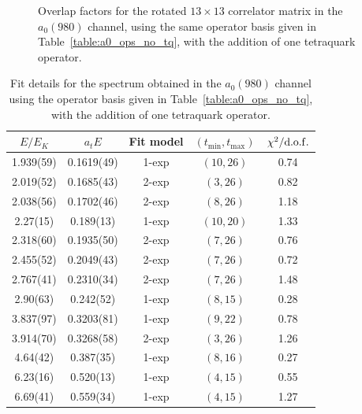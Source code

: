 \begin{figure}
  \caption{Overlap factors for the rotated $13\times 13$ correlator matrix in the $a_0(980)$ channel, using the same operator basis given in Table~\ref{table:a0_ops_no_tq}, with the addition of one tetraquark operator.}
  \label{fig:a0_with_tq_zfactors}
\end{figure}

\begin{table}
  \centering
  \begin{tabular}{c|c|c|c|c}
    $E / E_K$ & $a_t E$ & Fit model & $(t_{\mathrm{min}}, {t_\mathrm{max}})$ & $\chi^2 / \rm{d.o.f.}$\\
    \hline
    1.939(59)&0.1619(49)&1{-}exp&$(10, 26)$&0.74\\
    2.019(52)&0.1685(43)&2{-}exp&$(3, 26)$&0.82\\
    2.038(56)&0.1702(46)&2{-}exp&$(8, 26)$&1.18\\
    2.27(15)&0.189(13)&1{-}exp&$(10, 20)$&1.33\\
    2.318(60)&0.1935(50)&2{-}exp&$(7, 26)$&0.76\\
    2.455(52)&0.2049(43)&2{-}exp&$(7, 26)$&0.72\\
    2.767(41)&0.2310(34)&2{-}exp&$(7, 26)$&1.48\\
    2.90(63)&0.242(52)&1{-}exp&$(8, 15)$&0.28\\
    3.837(97)&0.3203(81)&1{-}exp&$(9, 22)$&0.78\\
    3.914(70)&0.3268(58)&2{-}exp&$(3, 26)$&1.26\\
    4.64(42)&0.387(35)&1{-}exp&$(8, 16)$&0.27\\
    6.23(16)&0.520(13)&1{-}exp&$(4, 15)$&0.55\\
    6.69(41)&0.559(34)&1{-}exp&$(4, 15)$&1.27
  \end{tabular}
  \caption{Fit details for the spectrum obtained in the $a_0(980)$ channel using the operator basis given in Table~\ref{table:a0_ops_no_tq}, with the addition of one tetraquark operator.}
  \label{table:a0_with_tq_spectrum}
\end{table}